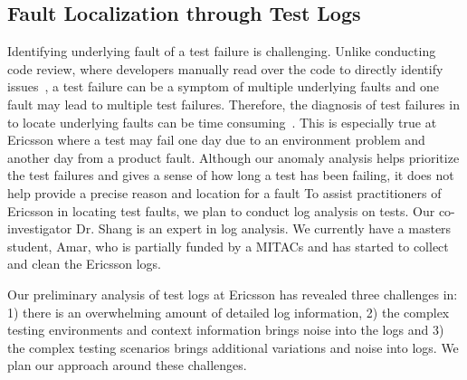\subsection{Fault Localization through Test Logs}

Identifying underlying fault of a test failure is challenging. Unlike conducting code review, where developers manually read over the code to directly identify issues~\cite{}, a test failure can be a symptom of multiple underlying faults and one fault may lead to multiple test failures. Therefore, the diagnosis of test failures in to locate underlying faults can be time consuming~\cite{}. This is especially true at Ericsson where a test may fail one day due to an environment problem and another day from a product fault. Although our anomaly analysis helps prioritize the test failures and gives a sense of how long a test has been failing, it does not help provide a precise reason and location for a fault
To assist practitioners of Ericsson in locating test faults, we plan to conduct log analysis on tests. Our co-investigator Dr. Shang is an expert in log analysis. We currently have a masters student, Amar, who is partially funded by a MITACs and has started to collect and clean the Ericsson logs.

Our preliminary analysis of test logs at Ericsson has revealed three challenges in: 1) there is an overwhelming amount of detailed log information, 2) the complex testing environments and context information brings noise into the logs and 3) the complex testing scenarios brings additional variations and noise into logs. We plan our approach around these challenges. 

